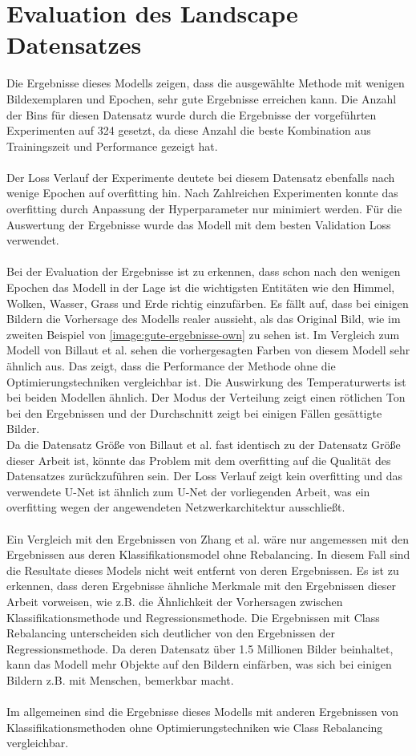 \section{Evaluation des Landscape Datensatzes}
Die Ergebnisse dieses Modells zeigen, dass die ausgewählte Methode mit wenigen Bildexemplaren und Epochen, sehr gute Ergebnisse erreichen kann.
Die Anzahl der Bins für diesen Datensatz wurde durch die Ergebnisse der vorgeführten Experimenten auf 324 gesetzt, da diese Anzahl die beste Kombination
aus Trainingszeit und Performance gezeigt hat.
\\
\\
Der Loss Verlauf der Experimente deutete bei diesem Datensatz ebenfalls nach wenige Epochen auf \gls{overfitting} hin. Nach Zahlreichen Experimenten
konnte das \gls{overfitting} durch Anpassung der Hyperparameter nur minimiert werden. Für die Auswertung der Ergebnisse wurde das Modell mit dem besten
Validation Loss verwendet.
\\
\\
Bei der Evaluation der Ergebnisse ist zu erkennen, dass schon nach den wenigen Epochen das Modell in der Lage ist die wichtigsten Entitäten wie den Himmel, Wolken, Wasser,
Grass und Erde richtig einzufärben. Es fällt auf, dass bei einigen Bildern die Vorhersage des Modells realer aussieht, als das Original Bild,
wie im zweiten Beispiel von \ref{image:gute-ergebnisse-own} zu sehen ist. Im Vergleich zum Modell von Billaut et al. sehen die vorhergesagten 
Farben von diesem Modell sehr ähnlich aus. Das zeigt, dass die Performance der Methode ohne die Optimierungstechniken vergleichbar ist.
Die Auswirkung des Temperaturwerts ist bei beiden Modellen ähnlich. Der Modus der Verteilung zeigt einen rötlichen Ton bei den
Ergebnissen und der Durchschnitt zeigt bei einigen Fällen gesättigte Bilder.
\\
Da die Datensatz Größe von Billaut et al. fast identisch zu der Datensatz Größe dieser Arbeit ist, könnte das Problem mit dem \gls{overfitting}
auf die Qualität des Datensatzes zurückzuführen sein. Der Loss Verlauf zeigt kein \gls{overfitting} und das verwendete U-Net ist ähnlich zum
U-Net der vorliegenden Arbeit, was ein \gls{overfitting} wegen der angewendeten Netzwerkarchitektur ausschließt. 
\\
\\
Ein Vergleich mit den Ergebnissen von Zhang et al. wäre nur angemessen mit den Ergebnissen aus deren Klassifikationsmodel ohne Rebalancing.
In diesem Fall sind die Resultate dieses Models nicht weit entfernt von deren Ergebnissen. Es ist zu erkennen, dass deren Ergebnisse ähnliche
Merkmale mit den Ergebnissen dieser Arbeit vorweisen, wie z.B. die Ähnlichkeit der Vorhersagen zwischen Klassifikationsmethode und Regressionsmethode.
Die Ergebnissen mit Class Rebalancing unterscheiden sich deutlicher von den Ergebnissen der Regressionsmethode. 
Da deren Datensatz über 1.5 Millionen Bilder beinhaltet, kann das Modell mehr Objekte auf den
Bildern einfärben, was sich bei einigen Bildern z.B. mit Menschen, bemerkbar macht. 
\\
\\
Im allgemeinen sind die Ergebnisse dieses Modells mit anderen Ergebnissen von Klassifikationsmethoden ohne Optimierungstechniken wie Class Rebalancing
vergleichbar.